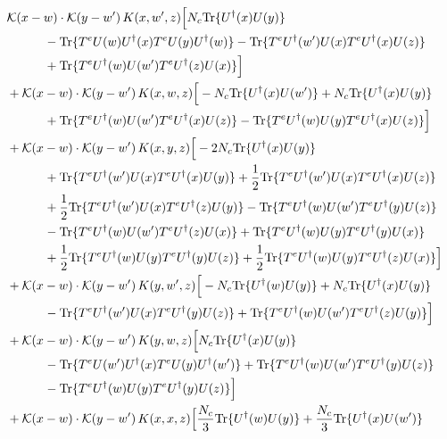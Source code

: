 \documentclass[10pt]{article}
\numberwithin{equation}{section}
\begin{document}
\begin{align}
&\mathcal K(x-w)\cdot\mathcal K(y-w')\,K(x,w',z)\Big[N_c{\rm Tr}\{U^\dagger(x)U(y)\}\notag\\
&\quad\quad\quad-{\rm Tr}\{T^eU(w)U^\dagger(x)T^eU(y)U^\dagger(w)\}-{\rm Tr}\{T^eU^\dagger(w')U(x)T^eU^\dagger(x)U(z)\}\notag\\
&\quad\quad\quad+{\rm Tr}\{T^eU^\dagger(w)U(w')T^eU^\dagger(z)U(x)\}\Big]\notag\\
&+\mathcal K(x-w)\cdot\mathcal K(y-w')\,K(x,w,z)\Big[-N_c{\rm Tr}\{U^\dagger(x)U(w')\}+N_c{\rm Tr}\{U^\dagger(x)U(y)\}\notag\\
&\quad\quad\quad+{\rm Tr}\{T^eU^\dagger(w)U(w')T^eU^\dagger(x)U(z)\}-{\rm Tr}\{T^eU^\dagger(w)U(y)T^eU^\dagger(x)U(z)\}\Big]\notag\\
&+\mathcal K(x-w)\cdot\mathcal K(y-w')\,K(x,y,z)\Big[-2 N_c{\rm Tr}\{U^\dagger(x)U(y)\}\notag\\
&\quad\quad\quad+{\rm Tr}\{T^eU^\dagger(w')U(x)T^eU^\dagger(x)U(y)\}+\frac{1}{2}{\rm Tr}\{T^eU^\dagger(w')U(x)T^eU^\dagger(x)U(z)\}\notag\\
&\quad\quad\quad+\frac{1}{2}{\rm Tr}\{T^eU^\dagger(w')U(x)T^eU^\dagger(z)U(y)\}-{\rm Tr}\{T^eU^\dagger(w)U(w')T^eU^\dagger(y)U(z)\}\notag\\
&\quad\quad\quad-{\rm Tr}\{T^eU^\dagger(w)U(w')T^eU^\dagger(z)U(x)\}+{\rm Tr}\{T^eU^\dagger(w)U(y)T^eU^\dagger(y)U(x)\}\notag\\
&\quad\quad\quad+\frac{1}{2}{\rm Tr}\{T^eU^\dagger(w)U(y)T^eU^\dagger(y)U(z)\}+\frac{1}{2}{\rm Tr}\{T^eU^\dagger(w)U(y)T^eU^\dagger(z)U(x)\}\Big]\notag\\
&+\mathcal K(x-w)\cdot\mathcal K(y-w')\,K(y,w',z)\Big[-N_c{\rm Tr}\{U^\dagger(w)U(y)\}+N_c{\rm Tr}\{U^\dagger(x)U(y)\}\notag\\
&\quad\quad\quad-{\rm Tr}\{T^eU^\dagger(w')U(x)T^eU^\dagger(y)U(z)\}+{\rm Tr}\{T^eU^\dagger(w)U(w')T^eU^\dagger(z)U(y)\}\Big]\notag\\
&+\mathcal K(x-w)\cdot\mathcal K(y-w')\,K(y,w,z)\Big[N_c{\rm Tr}\{U^\dagger(x)U(y)\}\notag\\
&\quad\quad\quad-{\rm Tr}\{T^eU(w')U^\dagger(x)T^eU(y)U^\dagger(w')\}+{\rm Tr}\{T^eU^\dagger(w)U(w')T^eU^\dagger(y)U(z)\}\notag\\
&\quad\quad\quad-{\rm Tr}\{T^eU^\dagger(w)U(y)T^eU^\dagger(y)U(z)\}\Big]\notag\\
&+\mathcal K(x-w)\cdot\mathcal K(y-w')\,K(x,x,z)\Big[\frac{N_c}{3}{\rm Tr}\{U^\dagger(w)U(y)\}+\frac{N_c}{3}{\rm Tr}\{U^\dagger(x)U(w')\}\notag\\

\end{align}
\end{document}
